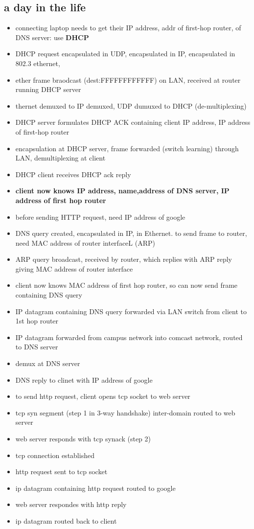 \documentclass[10pt]{article}
\theoremstyle{break}
\begin{document}
\subsection{a day in the life}
\begin{itemize}
    \item connecting laptop needs to get their IP address, addr of first-hop router, of DNS server: use \textbf{DHCP}
    \item DHCP request encapsulated in UDP, encapsulated in IP, encapsulated in 802.3 ethernet,
    \item ether frame braodcast (dest:FFFFFFFFFFFF) on LAN, received at router running DHCP server
    \item thernet demuxed to IP demuxed, UDP dumuxed to DHCP (de-multiplexing)
    \item DHCP server formulates DHCP ACK containing client IP address, IP address of first-hop router
    \item encapsulation at DHCP server, frame forwarded (switch learning) through LAN, demultiplexing at client
    \item DHCP client receives DHCP ack reply
    \item \textbf{client now knows IP address, name,address of DNS server, IP address of first hop router}
    \item before sending HTTP request, need IP address of google
    \item DNS query created, encapsulated in IP, in Ethernet. to send frame to router, need MAC address of router interfaceL (ARP)
    \item ARP query broadcast, received by router, which replies with ARP reply giving MAC address of router interface
    \item client now knows MAC address of first hop router, so can now send frame containing DNS query
    \item IP datagram containing DNS query forwarded via LAN switch from client to 1st hop router 
    \item IP datagram forwarded from campus network into comcast network, routed to DNS server
    \item demux at DNS server 
    \item DNS reply to clinet with IP address of google 
    \item to send http request, client opens tcp socket to web server 
    \item tcp syn segment (step 1 in 3-way handshake) inter-domain routed to web server 
    \item web server responds with tcp synack (step 2)
    \item tcp connection established
    \item http request sent to tcp socket 
    \item ip datagram containing http request routed to google 
    \item web server respondes with http reply 
    \item ip datagram routed back to client
\end{itemize}
\end{document}
